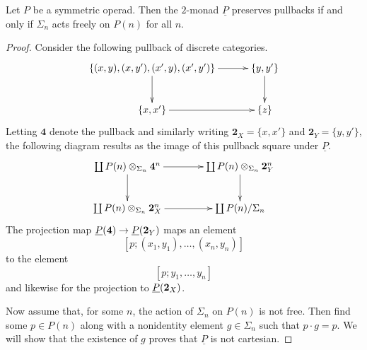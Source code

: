 \begin{prop}
Let $P$ be a symmetric operad. Then the $2$-monad $\underline{P}$ preserves pullbacks if and only if $\Sigma_{n}$ acts freely on $P(n)$ for all $n$.
\end{prop}
\begin{proof}
Consider the following pullback of discrete categories.
    \[
        \xy
            (0,0)*+{\lbrace (x,y), (x,y'), (x',y), (x',y') \rbrace}="00";
            (40,0)*+{\lbrace y,y' \rbrace}="10";
            (0,-15)*+{\lbrace x, x' \rbrace}="01";
            (40,-15)*+{\lbrace z \rbrace}="11";
            {\ar "00" ; "10"};
            {\ar "10" ; "11"};
            {\ar "00" ; "01"};
            {\ar "01" ; "11"};
        \endxy
    \]
Letting $\mathbf{4}$ denote the pullback and similarly writing $\mathbf{2}_X = \{ x, x' \}$ and $\mathbf{2}_Y = \{y, y'\}$, the following diagram results as the image of this pullback square under $\underline{P}$.
    \[
        \xy
            (0,0)*+{\coprod \coeqsig{P}{\mathbf{4}}{n}}="00";
            (40,0)*+{\coprod \coeqsig{P}{\mathbf{2}_Y}{n}}="10";
            (0,-15)*+{\coprod \coeqsig{P}{\mathbf{2}_X}{n}}="01";
            (40,-15)*+{\coprod P(n)/\Sigma_n}="11";
            {\ar "00" ; "10"};
            {\ar "10" ; "11"};
            {\ar "00" ; "01"};
            {\ar "01" ; "11"}:
        \endxy
    \]
The projection map $\underline{P}(\mathbf{4}) \rightarrow \underline{P}(\mathbf{2}_Y)$ maps an element
    \[
        [p;(x_1,y_1), \ldots, (x_n,y_n)]
    \]
to the element
    \[
        [p;y_1,\ldots,y_n]
    \]
and likewise for the projection to $\underline{P}(\mathbf{2}_X)$.

Now assume that, for some $n$, the action of $\Sigma_n$ on $P(n)$ is not free. Then find some $p \in P(n)$ along with a nonidentity element $g \in \Sigma_n$ such that $p \cdot g = p$. We will show that the existence of $g$ proves that $\underline{P}$ is not cartesian.


\end{proof}
